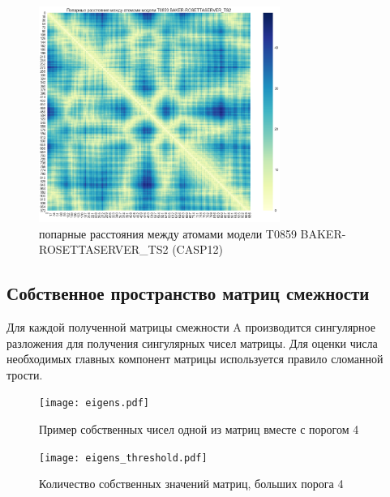 \documentclass[14pt]{extarticle}
\begin{document}
	\begin{figure}[H]
		\centering
		\includegraphics[width=0.7\textwidth]{pairwise.pdf}
		\caption{попарные расстояния между атомами модели T0859 BAKER-ROSETTASERVER\_TS2 (CASP12)}
		\label{protein_vis}
\end{figure}


\subsection{Собственное пространство матриц смежности}
Для каждой полученной матрицы смежности A производится сингулярное разложения для получения сингулярных чисел матрицы. Для оценки числа необходимых главных компонент матрицы используется правило сломанной трости.
\begin{figure}[H]
		\centering
		\texttt{[image: eigens.pdf]}
		\caption{Пример собственных чисел одной из матриц вместе с порогом 4}
		\label{fig:eigens}
\end{figure}
\begin{figure}[H]
		\centering
		\texttt{[image: eigens\_threshold.pdf]}
		\caption{Количество собственных значений матриц, больших порога 4}
		\label{fig:threshold}
\end{figure}
\end{document}
